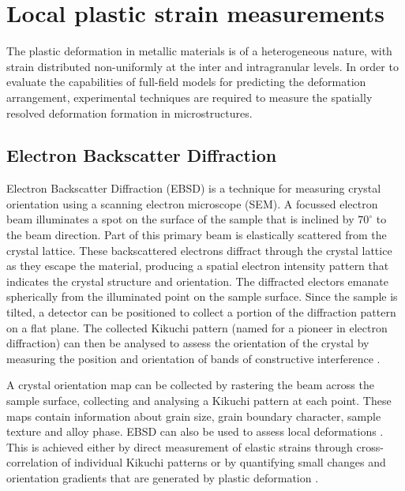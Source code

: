 
\chapter{Local plastic strain measurements} %

\label{AppendixX} %



The plastic deformation in metallic materials is of a heterogeneous nature, with strain distributed non-uniformly at the inter and intragranular levels. In order to evaluate the capabilities of full-field models for predicting the deformation arrangement, experimental techniques are required to measure the spatially resolved deformation formation in microstructures.

\section{Electron Backscatter Diffraction}
\label{Electron Backscatter Diffraction}

Electron Backscatter Diffraction (EBSD) is a technique for measuring crystal orientation using a scanning electron microscope (SEM). A focussed electron beam illuminates a spot on the surface of the sample that is inclined by $70^{\circ}$  to the beam direction. Part of this primary beam is elastically scattered from the crystal lattice. These backscattered electrons diffract through the crystal lattice as they escape the material, producing a spatial electron intensity pattern that indicates the crystal structure and orientation. The diffracted electors emanate spherically from the illuminated point on the sample surface. Since the sample is tilted, a detector can be positioned to collect a portion of the diffraction pattern on a flat plane. The collected Kikuchi pattern (named for a pioneer in electron diffraction) can then be analysed to assess the orientation of the crystal by measuring the position and orientation of bands of constructive interference \cite{maitland2007electron}.

\noindent A crystal orientation map can be collected by rastering the beam across the sample surface, collecting and analysing a Kikuchi pattern at each point. These maps contain information about grain size, grain boundary character, sample texture and alloy phase. EBSD can also be used to assess local deformations \cite{wright2011review}. This is achieved either by direct measurement of elastic strains through cross-correlation of individual Kikuchi patterns \cite{wilkinson2006high,wilkinson2006high,britton2012high} or by quantifying small changes and orientation gradients that are generated by plastic deformation \cite{kamaya2004measurement,kamaya2007local,githinji2013ebsd}.

